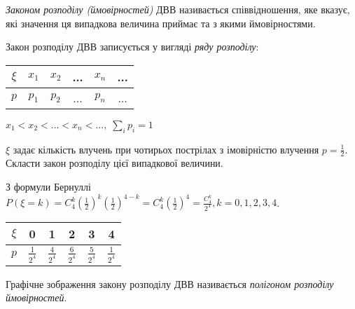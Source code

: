 \begin{definition}
    \emph{Законом розподілу (ймовірностей)} ДВВ називається співвідношення, яке вказує, 
    які значення ця випадкова величина приймає та з якими ймовірностями.

    Закон розподілу ДВВ записується у вигляді \emph{ряду розподілу}:

    \begin{tabular}{c|c|c|c|c|c}
        $\xi$ & $x_1$ & $x_2$ & ... & $x_n$ & ... \\
        \hline
        $p$ & $p_1$ & $p_2$ & ... & $p_n$ & ...
    \end{tabular}
    \hspace{40pt}
    $x_1 < x_2 < ... < x_n < ...,\; \sum\limits_i p_i = 1$
\end{definition}
\begin{example}
    $\xi$ задає кількість влучень при чотирьох пострілах з імовірністю влучення 
    $p = \frac{1}{2}$. Скласти закон розподілу цієї випадкової величини.

    З формули Бернуллі $P(\xi = k) = C_4^k \left(\frac{1}{2}\right)^k \left(\frac{1}{2}\right)^{4-k} = 
    C_4^k \left(\frac{1}{2}\right)^4 = \frac{C_4^k}{2^4}, k = 0,1,2,3,4$.

    \begin{tabular}{c|c|c|c|c|c}
        $\xi$ & 0 & 1 & 2 & 3 & 4 \\
        \hline
        $p$ & $\frac{1}{2^4}$ & $\frac{4}{2^4}$ & $\frac{6}{2^4}$ & $\frac{5}{2^4}$ & 
        $\frac{1}{2^4}$
    \end{tabular}
\end{example}
\newpage
\begin{definition}
    Графічне зображення закону розподілу ДВВ називається 
    \emph{полігоном розподілу ймовірностей}.
\end{definition}

